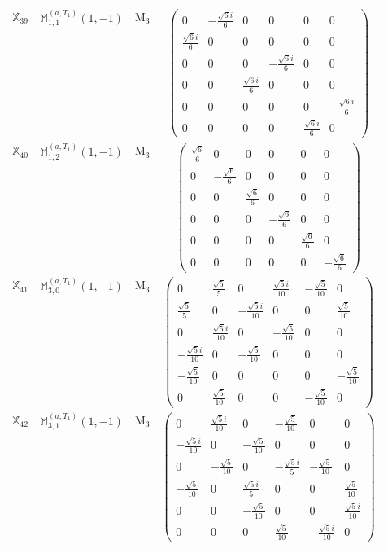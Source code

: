 \documentclass[fleqn,10pt,landscape]{article}
\begin{document}
\begin{itemize}
\begin{center}
\begin{longtable}{c|c|c|c}
$ \mathbb{X}_{39} $ & $\mathbb{M}_{1,1}^{(a,T_{1})}(1,-1)$ & M$_{3}$ & $\begin{pmatrix} 0 & - \frac{\sqrt{6} i}{6} & 0 & 0 & 0 & 0 \\ \frac{\sqrt{6} i}{6} & 0 & 0 & 0 & 0 & 0 \\ 0 & 0 & 0 & - \frac{\sqrt{6} i}{6} & 0 & 0 \\ 0 & 0 & \frac{\sqrt{6} i}{6} & 0 & 0 & 0 \\ 0 & 0 & 0 & 0 & 0 & - \frac{\sqrt{6} i}{6} \\ 0 & 0 & 0 & 0 & \frac{\sqrt{6} i}{6} & 0 \end{pmatrix}$ \\
$ \mathbb{X}_{40} $ & $\mathbb{M}_{1,2}^{(a,T_{1})}(1,-1)$ & M$_{3}$ & $\begin{pmatrix} \frac{\sqrt{6}}{6} & 0 & 0 & 0 & 0 & 0 \\ 0 & - \frac{\sqrt{6}}{6} & 0 & 0 & 0 & 0 \\ 0 & 0 & \frac{\sqrt{6}}{6} & 0 & 0 & 0 \\ 0 & 0 & 0 & - \frac{\sqrt{6}}{6} & 0 & 0 \\ 0 & 0 & 0 & 0 & \frac{\sqrt{6}}{6} & 0 \\ 0 & 0 & 0 & 0 & 0 & - \frac{\sqrt{6}}{6} \end{pmatrix}$ \\
$ \mathbb{X}_{41} $ & $\mathbb{M}_{3,0}^{(a,T_{1})}(1,-1)$ & M$_{3}$ & $\begin{pmatrix} 0 & \frac{\sqrt{5}}{5} & 0 & \frac{\sqrt{5} i}{10} & - \frac{\sqrt{5}}{10} & 0 \\ \frac{\sqrt{5}}{5} & 0 & - \frac{\sqrt{5} i}{10} & 0 & 0 & \frac{\sqrt{5}}{10} \\ 0 & \frac{\sqrt{5} i}{10} & 0 & - \frac{\sqrt{5}}{10} & 0 & 0 \\ - \frac{\sqrt{5} i}{10} & 0 & - \frac{\sqrt{5}}{10} & 0 & 0 & 0 \\ - \frac{\sqrt{5}}{10} & 0 & 0 & 0 & 0 & - \frac{\sqrt{5}}{10} \\ 0 & \frac{\sqrt{5}}{10} & 0 & 0 & - \frac{\sqrt{5}}{10} & 0 \end{pmatrix}$ \\
$ \mathbb{X}_{42} $ & $\mathbb{M}_{3,1}^{(a,T_{1})}(1,-1)$ & M$_{3}$ & $\begin{pmatrix} 0 & \frac{\sqrt{5} i}{10} & 0 & - \frac{\sqrt{5}}{10} & 0 & 0 \\ - \frac{\sqrt{5} i}{10} & 0 & - \frac{\sqrt{5}}{10} & 0 & 0 & 0 \\ 0 & - \frac{\sqrt{5}}{10} & 0 & - \frac{\sqrt{5} i}{5} & - \frac{\sqrt{5}}{10} & 0 \\ - \frac{\sqrt{5}}{10} & 0 & \frac{\sqrt{5} i}{5} & 0 & 0 & \frac{\sqrt{5}}{10} \\ 0 & 0 & - \frac{\sqrt{5}}{10} & 0 & 0 & \frac{\sqrt{5} i}{10} \\ 0 & 0 & 0 & \frac{\sqrt{5}}{10} & - \frac{\sqrt{5} i}{10} & 0 \end{pmatrix}$ \\

\end{longtable}
\end{center}
\end{itemize}
\end{document}
